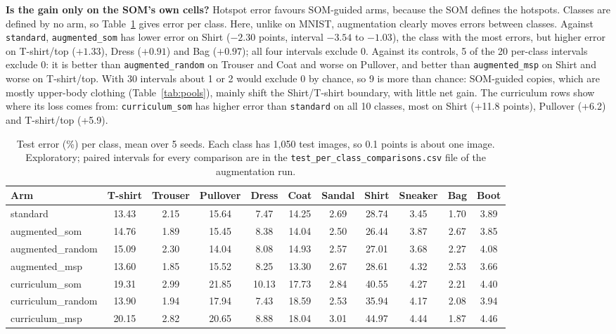 \documentclass[11pt]{article}
\begin{document}
\textbf{Is the gain only on the SOM's own cells?} Hotspot error favours SOM-guided arms, because the SOM defines the hotspots. Classes are defined by no arm, so Table~\ref{tab:per_class} gives error per class. Here, unlike on MNIST, augmentation clearly moves errors between classes. Against \texttt{standard}, \texttt{augmented\_som} has lower error on Shirt ($-2.30$ points, interval $-3.54$ to $-1.03$), the class with the most errors, but higher error on T-shirt/top ($+1.33$), Dress ($+0.91$) and Bag ($+0.97$); all four intervals exclude 0. Against its controls, 5 of the 20 per-class intervals exclude 0: it is better than \texttt{augmented\_random} on Trouser and Coat and worse on Pullover, and better than \texttt{augmented\_msp} on Shirt and worse on T-shirt/top. With 30 intervals about 1 or 2 would exclude 0 by chance, so 9 is more than chance: SOM-guided copies, which are mostly upper-body clothing (Table~\ref{tab:pools}), mainly shift the Shirt/T-shirt boundary, with little net gain. The curriculum rows show where its loss comes from: \texttt{curriculum\_som} has higher error than \texttt{standard} on all 10 classes, most on Shirt (+11.8 points), Pullover (+6.2) and T-shirt/top (+5.9).

\begin{table}[H]
\centering
\renewcommand{\arraystretch}{1.1}
\footnotesize
{\setlength{\tabcolsep}{3pt}\begin{tabular}{|l|c|c|c|c|c|c|c|c|c|c|}
\hline
\textbf{Arm} & \textbf{T-shirt} & \textbf{Trouser} & \textbf{Pullover} & \textbf{Dress} & \textbf{Coat} & \textbf{Sandal} & \textbf{Shirt} & \textbf{Sneaker} & \textbf{Bag} & \textbf{Boot} \\ \hline
standard & 13.43 & 2.15 & 15.64 & 7.47 & 14.25 & 2.69 & 28.74 & 3.45 & 1.70 & 3.89 \\ \hline
augmented\_som & 14.76 & 1.89 & 15.45 & 8.38 & 14.04 & 2.50 & 26.44 & 3.87 & 2.67 & 3.85 \\ \hline
augmented\_random & 15.09 & 2.30 & 14.04 & 8.08 & 14.93 & 2.57 & 27.01 & 3.68 & 2.27 & 4.08 \\ \hline
augmented\_msp & 13.60 & 1.85 & 15.52 & 8.25 & 13.30 & 2.67 & 28.61 & 4.32 & 2.53 & 3.66 \\ \hline
curriculum\_som & 19.31 & 2.99 & 21.85 & 10.13 & 17.73 & 2.84 & 40.55 & 4.27 & 2.21 & 4.40 \\ \hline
curriculum\_random & 13.90 & 1.94 & 17.94 & 7.43 & 18.59 & 2.53 & 35.94 & 4.17 & 2.08 & 3.94 \\ \hline
curriculum\_msp & 20.15 & 2.82 & 20.65 & 8.88 & 18.04 & 3.01 & 44.97 & 4.44 & 1.87 & 4.46 \\ \hline
\end{tabular}}
\caption{Test error (\%) per class, mean over 5 seeds. Each class has 1,050 test images, so 0.1 points is about one image. Exploratory; paired intervals for every comparison are in the \texttt{test\_per\_class\_comparisons.csv} file of the augmentation run.}
\label{tab:per_class}
\end{table}
\end{document}
